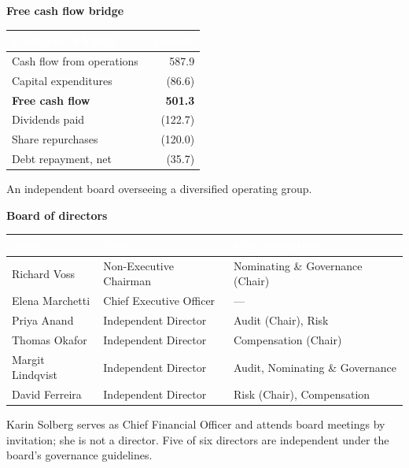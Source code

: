 \documentclass[11pt,oneside,a4paper]{scrbook}
\newcommand{\goldrule}{\noindent{\color{merGold}\rule{\linewidth}{1.1pt}}\par\vspace{2pt}\noindent{\color{merNavy!25}\rule{\linewidth}{0.4pt}}\vspace{10pt}\par}
\newcommand{\sectionlede}[1]{{\color{merSlate}\large #1}\par\vspace{6pt}}
\begin{document}
\vspace{16pt}
{\bfseries\color{merNavy} Free cash flow bridge}\par
\vspace{4pt}
\begin{tabular}{lr}
\toprule
\rowcolor{merNavy}
\textcolor{white}{\bfseries \$ millions, FY2025} & \textcolor{white}{\bfseries Amount} \\
\midrule
Cash flow from operations & 587.9 \\
Capital expenditures & (86.6) \\
\midrule
\rowcolor{merPaper}
\textbf{Free cash flow} & \textbf{501.3} \\
\midrule
Dividends paid & (122.7) \\
Share repurchases & (120.0) \\
Debt repayment, net & (35.7) \\
\bottomrule
\end{tabular}

\goldrule

\sectionlede{An independent board overseeing a diversified operating group.}

{\bfseries\color{merNavy} Board of directors}\par
\vspace{4pt}
\begin{tabularx}{\linewidth}{@{}llX@{}}
\toprule
\rowcolor{merNavy}
\textcolor{white}{\bfseries Name} & \textcolor{white}{\bfseries Role} & \textcolor{white}{\bfseries Key committees} \\
\midrule
Richard Voss & Non-Executive Chairman & Nominating \& Governance (Chair) \\
Elena Marchetti & Chief Executive Officer & --- \\
Priya Anand & Independent Director & Audit (Chair), Risk \\
Thomas Okafor & Independent Director & Compensation (Chair) \\
Margit Lindqvist & Independent Director & Audit, Nominating \& Governance \\
David Ferreira & Independent Director & Risk (Chair), Compensation \\
\bottomrule
\end{tabularx}

\vspace{6pt}
{\footnotesize\color{merSlate} Karin Solberg serves as Chief Financial Officer and attends board meetings by invitation; she is not a director. Five of six directors are independent under the board's governance guidelines.}
\end{document}
